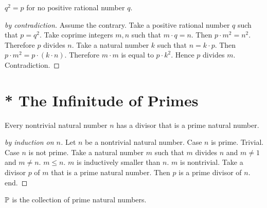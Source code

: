 \documentclass{article}
\begin{document}

    \begin{proposition}
      $q^{2} = p$ for no positive rational number $q$.
    \end{proposition}
    \begin{proof}[by contradiction]
      Assume the contrary.
      Take a positive rational number $q$ such that $p = q^{2}$.
      Take coprime integers $m,n$ such that $m \cdot q = n$.
      Then $p \cdot m^{2} = n^{2}$.
      Therefore $p$ divides $n$.
      Take a natural number $k$ such that $n = k \cdot p$.
      Then $p \cdot m^{2} = p \cdot (k \cdot n)$.
      Therefore $m \cdot m$ is equal to $p \cdot k^{2}$.
      Hence $p$ divides $m$.
      Contradiction.
    \end{proof}


\section{* The Infinitude of Primes}




\begin{lemma}
Every nontrivial natural number $n$ has a divisor 
that is a prime natural number.
\end{lemma}
\begin{proof}[by induction on $n$]
Let $n$ be a nontrivial natural number. %
Case $n$ is prime. Trivial.
Case $n$ is not prime.
Take a natural number $m$ such that $m$ divides $n$ 
and $m \neq 1$ and $m \neq n$. $m \leq n$.
$m$ is inductively smaller than $n$. $m$ is nontrivial.
Take a divisor $p$ of $m$ that is a prime natural number.
Then $p$ is a prime divisor of $n$.
end.
\end{proof}


\begin{signature}
$\mathbb{P}$ is the collection of prime natural numbers.
\end{signature}
\end{document}
